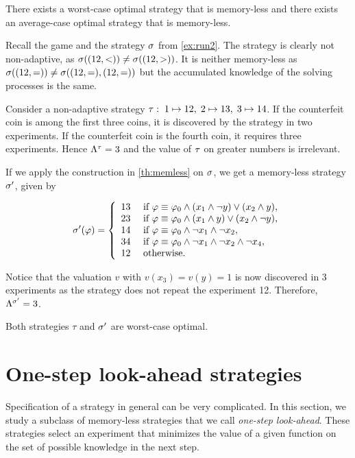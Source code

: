 \begin{corollary}
There exists a worst-case optimal strategy that is memory-less
and there exists an average-case optimal strategy that is memory-less.
\end{corollary}

\begin{example}
Recall the game and the strategy $\sigma$ from \autoref{ex:run2}.
The strategy is clearly not non-adaptive, as
  $\sigma((12, <)) \not= \sigma((12, >))$.
It is neither memory-less as
  $\sigma((12, =)) \not= \sigma((12,=),(12,=))$ but
  the accumulated knowledge of the solving processes is the same.

Consider a non-adaptive strategy
 $\tau:\; 1 \mapsto 12,\; 2\mapsto 13,\; 3\mapsto 14$.
If the counterfeit coin is among the first three coins,
  it is discovered by the strategy in two experiments.
If the counterfeit coin is the fourth coin, it requires three experiments.
Hence $\Lambda^{\tau} = 3$ and the value of $\tau$ on
  greater numbers is irrelevant.

If we apply the construction in \autoref{th:memless} on $\sigma$,
we get a memory-less strategy $\sigma'$, given by

\[
\sigma'(\varphi) = \left\{\begin{array}{ll}
13 & \textrm{ if } \varphi \equiv \varphi_0 \wedge (x_1 \wedge \neg y) \vee (x_2 \wedge y), \\
23 & \textrm{ if } \varphi \equiv \varphi_0 \wedge (x_1 \wedge y) \vee (x_2 \wedge \neg y),\\
14 & \textrm{ if } \varphi \equiv \varphi_0 \wedge \neg x_1 \wedge \neg x_2, \\
34 & \textrm{ if } \varphi \equiv \varphi_0 \wedge \neg x_1 \wedge \neg x_2 \wedge \neg x_4, \\
12 & \textrm{ otherwise.}
\end{array}\right.
\]

Notice that the valuation $v$ with $v(x_3) = v(y) = 1$ is now discovered in
  3 experiments as the strategy does not repeat the experiment 12.
Therefore, $\Lambda^{\sigma'} = 3$.

Both strategies $\tau$ and $\sigma'$ are worst-case optimal. \eqed
\end{example}

\section{One-step look-ahead strategies} \label{sec:oslas}

Specification of a strategy in general can be very complicated.
In this section, we study a subclass of memory-less strategies that we call
  \emph{one-step look-ahead}.
These strategies select an experiment that
  minimizes the value of a given function
  on the set of possible knowledge in the next step.

